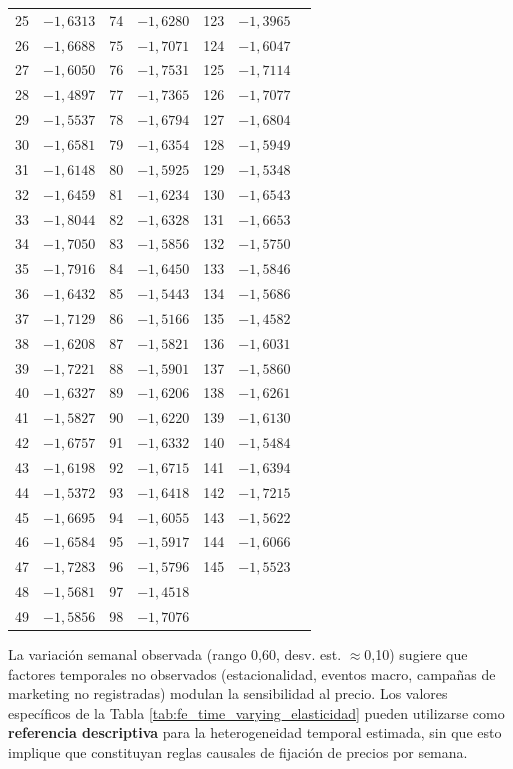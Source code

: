 \documentclass[doc, a4paper, biblatex, floatsintext, longtable, babel]{apa7}
\begin{document}
\begin{table}[!htbp]
\begin{tabular}{lcccccc}
25 & $-1,6313$ & 74 & $-1,6280$ & 123 & $-1,3965$ \\
26 & $-1,6688$ & 75 & $-1,7071$ & 124 & $-1,6047$ \\
27 & $-1,6050$ & 76 & $-1,7531$ & 125 & $-1,7114$ \\
28 & $-1,4897$ & 77 & $-1,7365$ & 126 & $-1,7077$ \\
29 & $-1,5537$ & 78 & $-1,6794$ & 127 & $-1,6804$ \\
30 & $-1,6581$ & 79 & $-1,6354$ & 128 & $-1,5949$ \\
31 & $-1,6148$ & 80 & $-1,5925$ & 129 & $-1,5348$ \\
32 & $-1,6459$ & 81 & $-1,6234$ & 130 & $-1,6543$ \\
33 & $-1,8044$ & 82 & $-1,6328$ & 131 & $-1,6653$ \\
34 & $-1,7050$ & 83 & $-1,5856$ & 132 & $-1,5750$ \\
35 & $-1,7916$ & 84 & $-1,6450$ & 133 & $-1,5846$ \\
36 & $-1,6432$ & 85 & $-1,5443$ & 134 & $-1,5686$ \\
37 & $-1,7129$ & 86 & $-1,5166$ & 135 & $-1,4582$ \\
38 & $-1,6208$ & 87 & $-1,5821$ & 136 & $-1,6031$ \\
39 & $-1,7221$ & 88 & $-1,5901$ & 137 & $-1,5860$ \\
40 & $-1,6327$ & 89 & $-1,6206$ & 138 & $-1,6261$ \\
41 & $-1,5827$ & 90 & $-1,6220$ & 139 & $-1,6130$ \\
42 & $-1,6757$ & 91 & $-1,6332$ & 140 & $-1,5484$ \\
43 & $-1,6198$ & 92 & $-1,6715$ & 141 & $-1,6394$ \\
44 & $-1,5372$ & 93 & $-1,6418$ & 142 & $-1,7215$ \\
45 & $-1,6695$ & 94 & $-1,6055$ & 143 & $-1,5622$ \\
46 & $-1,6584$ & 95 & $-1,5917$ & 144 & $-1,6066$ \\
47 & $-1,7283$ & 96 & $-1,5796$ & 145 & $-1,5523$ \\
48 & $-1,5681$ & 97 & $-1,4518$ &  &  \\
49 & $-1,5856$ & 98 & $-1,7076$ &  &  \\
\bottomrule
\end{tabular}
\end{table}

La variación semanal observada (rango 0,60, desv. est. $ \approx$0,10) sugiere que factores temporales no observados (estacionalidad, eventos macro, campañas de marketing no registradas) modulan la sensibilidad al precio. Los valores específicos de la Tabla \ref{tab:fe_time_varying_elasticidad} pueden utilizarse como \textbf{referencia descriptiva} para la heterogeneidad temporal estimada, sin que esto implique que constituyan reglas causales de fijación de precios por semana.
\end{document}
